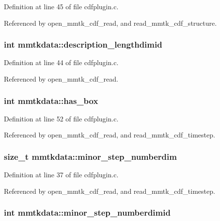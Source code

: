 Definition at line 45 of file cdfplugin.c.

Referenced by open\_\-mmtk\_\-cdf\_\-read, and read\_\-mmtk\_\-cdf\_\-structure.
\subsubsection{\setlength{\rightskip}{0pt plus 5cm}int mmtkdata::description\_\-lengthdimid}\label{structmmtkdata_m10}




Definition at line 44 of file cdfplugin.c.

Referenced by open\_\-mmtk\_\-cdf\_\-read.
\subsubsection{\setlength{\rightskip}{0pt plus 5cm}int mmtkdata::has\_\-box}\label{structmmtkdata_m18}




Definition at line 52 of file cdfplugin.c.

Referenced by open\_\-mmtk\_\-cdf\_\-read, and read\_\-mmtk\_\-cdf\_\-timestep.
\subsubsection{\setlength{\rightskip}{0pt plus 5cm}size\_\-t mmtkdata::minor\_\-step\_\-numberdim}\label{structmmtkdata_m3}




Definition at line 37 of file cdfplugin.c.

Referenced by open\_\-mmtk\_\-cdf\_\-read, and read\_\-mmtk\_\-cdf\_\-timestep.
\subsubsection{\setlength{\rightskip}{0pt plus 5cm}int mmtkdata::minor\_\-step\_\-numberdimid}\label{structmmtkdata_m2}




